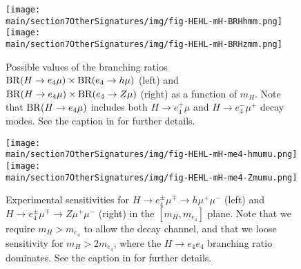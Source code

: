 \begin{figure}
\centering
\texttt{[image: \\main/section7OtherSignatures/img/fig-HEHL-mH-BRHhmm.png]}
\texttt{[image: \\main/section7OtherSignatures/img/fig-HEHL-mH-BRHzmm.png]}
\caption{
Possible values of the branching ratios ${\rm BR}(H \to e_4 \mu) \times {\rm BR}(e_4 \to h \mu)$ (left) and ${\rm BR}(H \to e_4 \mu) \times {\rm BR}(e_4 \to Z \mu)$ (right) as a function of $m_H$. Note that ${\rm BR}(H \to e_4 \mu)$ includes both $H \to e_4^+ \mu$ and $H \to e_4^- \mu^+$ decay modes. See the caption in  for further details.
}
\label{fig:scancombinedbr}
\end{figure}

\begin{figure}
\centering
\texttt{[image: \\main/section7OtherSignatures/img/fig-HEHL-mH-me4-hmumu.png]}
\texttt{[image: \\main/section7OtherSignatures/img/fig-HEHL-mH-me4-Zmumu.png]}
\caption{
Experimental sensitivities for $H \to e_4^\pm \mu^\mp \to h \mu^+ \mu^-$ (left) and $H \to e_4^\pm \mu^\mp \to Z \mu^+ \mu^-$ (right) in the $[m_H,m_{e_4}]$ plane. Note that we require $m_H>m_{e_4}$ to allow the decay channel, and that we loose sensitivity for $m_H > 2 m_{e_4}$, where the $H\to e_4 e_4$ branching ratio dominates. See the caption in  for further details. 
}
\label{fig:mHme4}
\end{figure}

